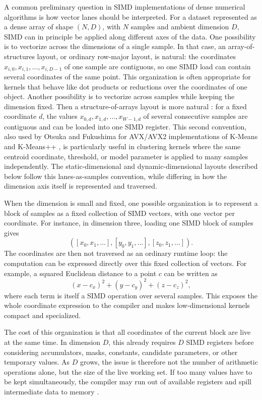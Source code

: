 \documentclass[11pt,a4paper]{article}
\begin{document}
A common preliminary question in SIMD implementations of dense numerical algorithms is how vector lanes should be interpreted. For a dataset represented as a dense array of shape $(N,D)$, with $N$ samples and ambient dimension $D$, SIMD can in principle be applied along different axes of the data. One possibility is to vectorize across the dimensions of a single sample. In that case, an array-of-structures layout, or ordinary row-major layout, is natural: the coordinates $x_{i,0},x_{i,1},\ldots,x_{i,D-1}$ of one sample are contiguous, so one SIMD load can contain several coordinates of the same point. This organization is often appropriate for kernels that behave like dot products or reductions over the coordinates of one object. Another possibility is to vectorize across samples while keeping the dimension fixed. Then a structure-of-arrays layout is more natural \cite{jubertie2018}: for a fixed coordinate $d$, the values $x_{0,d},x_{1,d},\ldots,x_{W-1,d}$ of several consecutive samples are contiguous and can be loaded into one SIMD register. This second convention, also used by Otsuka and Fukushima for AVX/AVX2 implementations of K-Means and K-Means++ \cite{otsuka2021}, is particularly useful in clustering kernels where the same centroid coordinate, threshold, or model parameter is applied to many samples independently. The static-dimensional and dynamic-dimensional layouts described below follow this lanes-as-samples convention, while differing in how the dimension axis itself is represented and traversed.

When the dimension is small and fixed, one possible organization is to represent a block of samples as a fixed collection of SIMD vectors, with one vector per coordinate. For instance, in dimension three, loading one SIMD block of samples gives \[ \left( [x_0,x_1,\ldots], [y_0,y_1,\ldots], [z_0,z_1,\ldots] \right). \] The coordinates are then not traversed as an ordinary runtime loop: the computation can be expressed directly over this fixed collection of vectors. For example, a squared Euclidean distance to a point $c$ can be written as \[ (x-c_x)^2 + (y-c_y)^2 + (z-c_z)^2, \] where each term is itself a SIMD operation over several samples. This exposes the whole coordinate expression to the compiler and makes low-dimensional kernels compact and specialized.

The cost of this organization is that all coordinates of the current block are live at the same time. In dimension $D$, this already requires $D$ SIMD registers before considering accumulators, masks, constants, candidate parameters, or other temporary values. As $D$ grows, the issue is therefore not the number of arithmetic operations alone, but the size of the live working set. If too many values have to be kept simultaneously, the compiler may run out of available registers and spill intermediate data to memory \cite{intelOptimizationManual}.
\end{document}
